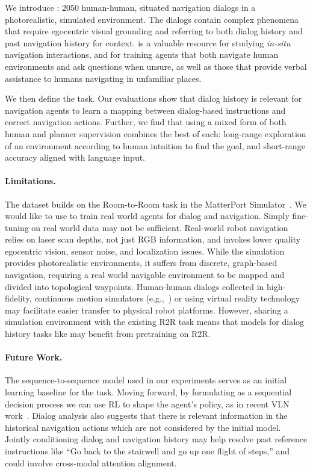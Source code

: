 
We introduce \datasetfull{}: 2050 human-human, situated navigation dialogs in a photorealistic, simulated environment.
The dialogs contain complex phenomena that require egocentric visual grounding and referring to both dialog history and past navigation history for context.
\dataset{} is a valuable resource for studying \textit{in-situ} navigation interactions, and for training agents that both navigate human environments and ask questions when unsure, as well as those that provide verbal assistance to humans navigating in unfamiliar places.

We then define the \taskfull{} task.
Our evaluations show that dialog history is relevant for navigation agents to learn a mapping between dialog-based instructions and correct navigation actions.
Further, we find that using a mixed form of both human and planner supervision combines the best of each: long-range exploration of an environment according to human intuition to find the goal, and short-range accuracy aligned with language input.

\paragraph{Limitations.}
The \dataset{} dataset builds on the Room-to-Room task in the MatterPort Simulator~\cite{anderson:cvpr18}.
We would like to use \dataset{} to train real world agents for dialog and navigation.
Simply fine-tuning on real world data may not be sufficient.
Real-world robot navigation relies on laser scan depths, not just RGB information, and invokes lower quality egocentric vision, sensor noise, and localization issues.
While the simulation provides photorealistic environments, it suffers from discrete, graph-based navigation, requiring a real world navigable environment to be mapped and divided into topological waypoints.
Human-human dialogs collected in high-fidelity, continuous motion simulators (e.g.,~\cite{ai2thor}) or using virtual reality technology may facilitate easier transfer to physical robot platforms.
However, sharing a simulation environment with the existing R2R task means that models for dialog history tasks like \task{} may benefit from pretraining on R2R.

\paragraph{Future Work.}
The sequence-to-sequence model used in our experiments serves as an initial learning baseline for the \task{} task.
Moving forward, by formulating \task{} as a sequential decision process we can use RL to shape the agent's policy, as in recent VLN work~\cite{tan:naacl19}.
Dialog analysis also suggests that there is relevant information in the historical navigation actions which are not considered by the initial model.
Jointly conditioning dialog and navigation history may help resolve past reference instructions like ``Go back to the stairwell and go up one flight of steps,'' and could involve cross-modal attention alignment.

